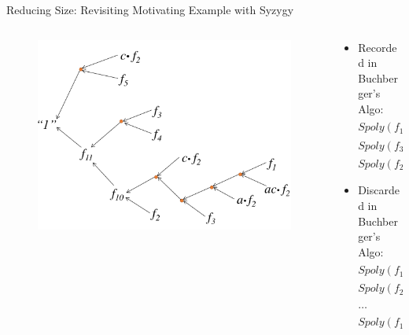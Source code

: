 \documentclass[xcolor=dvipsnames]{beamer}
\newcommand{\bi}{\begin{itemize}}
\newcommand{\ei}{\end{itemize}}
\begin{document}
\begin{frame}{\large{Reducing Size: Revisiting Motivating Example with Syzygy}}
\vspace{-0.2in}
\begin{columns}[onlytextwidth]
\begin{column}{0.5\textwidth}
\begin{figure}
\centering
\includegraphics[scale=0.25]{refutation_tree.pdf}
\end{figure}
\end{column}
\begin{column}{0.5\textwidth}
\bi
\item Recorded in Buchberger's Algo:\\
$Spoly(f_1,f_2)\xrightarrow{F}_+ f_{10}$\\
$Spoly(f_3,f_4)\xrightarrow{F}_+ f_{11}$\\
$Spoly(f_2,f_5)\xrightarrow{F}_+ 1$
\item Discarded in Buchberger's Algo:\\
$Spoly(f_1,f_3)\xrightarrow{F}_+ 0$\\
$Spoly(f_2,f_3)\xrightarrow{F}_+ 0$\\
$\dots$\\
$Spoly(f_1,f_5)\xrightarrow{F}_+ 0$
\ei
\end{column}
\end{columns}
\end{frame}
\end{document}
